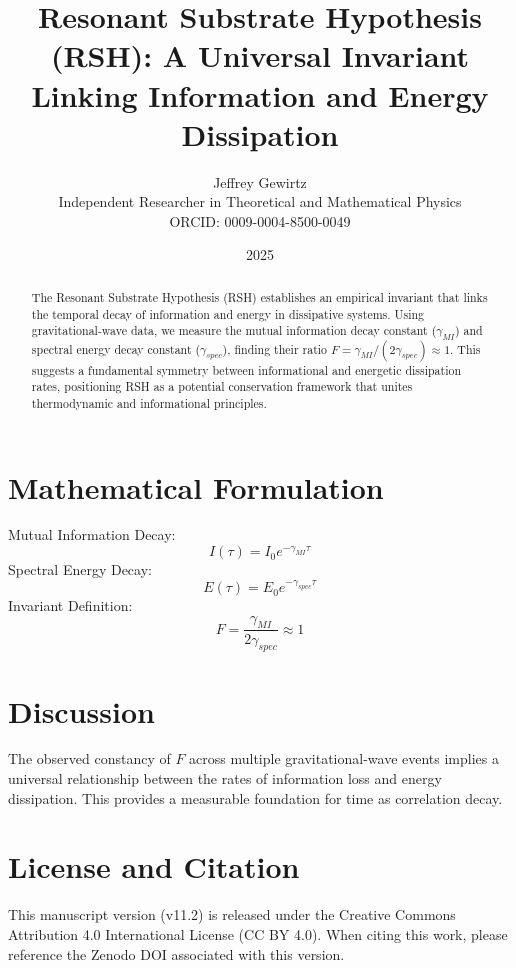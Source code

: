 \documentclass[12pt]{article}
\title{Resonant Substrate Hypothesis (RSH): A Universal Invariant Linking Information and Energy Dissipation}
\author{Jeffrey Gewirtz \\ Independent Researcher in Theoretical and Mathematical Physics \\ ORCID: 0009-0004-8500-0049}
\date{2025}
\begin{document}
\maketitle

\begin{abstract}
The Resonant Substrate Hypothesis (RSH) establishes an empirical invariant that links the temporal decay of information and energy in dissipative systems. Using gravitational-wave data, we measure the mutual information decay constant ($\gamma_{MI}$) and spectral energy decay constant ($\gamma_{spec}$), finding their ratio $F = \gamma_{MI} / (2\gamma_{spec}) \approx 1$. This suggests a fundamental symmetry between informational and energetic dissipation rates, positioning RSH as a potential conservation framework that unites thermodynamic and informational principles.
\end{abstract}

\section{Mathematical Formulation}
Mutual Information Decay:
\[ I(\tau) = I_0 e^{-\gamma_{MI}\tau} \]
Spectral Energy Decay:
\[ E(\tau) = E_0 e^{-\gamma_{spec}\tau} \]
Invariant Definition:
\[ F = \frac{\gamma_{MI}}{2\gamma_{spec}} \approx 1 \]

\section{Discussion}
The observed constancy of $F$ across multiple gravitational-wave events implies a universal relationship between the rates of information loss and energy dissipation. This provides a measurable foundation for time as correlation decay.

\section{License and Citation}
This manuscript version (v11.2) is released under the Creative Commons Attribution 4.0 International License (CC BY 4.0). When citing this work, please reference the Zenodo DOI associated with this version.
\end{document}
